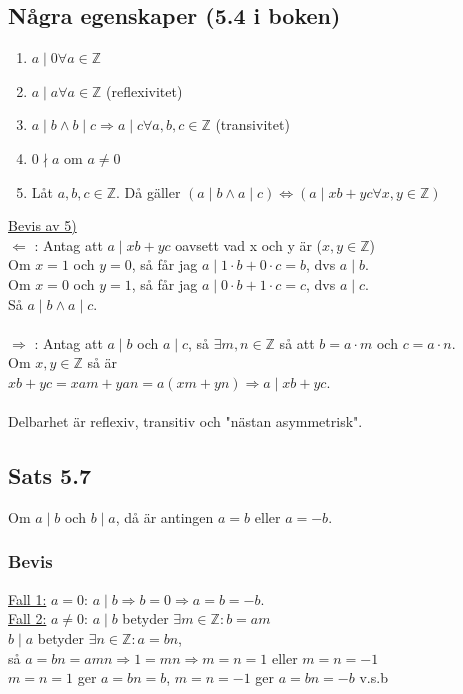 \documentclass{article}
\begin{document}
    \subsection{Några egenskaper (5.4 i boken)}
    \begin{enumerate}
        \item $a\mid 0 \forall a\in \mathbb{Z}$
        \item $a\mid a \forall a\in \mathbb{Z}$ (reflexivitet)
        \item $a\mid b\wedge b\mid c \Rightarrow a\mid c \forall a,b,c\in \mathbb{Z}$ (transivitet)
        \item $0\nmid a$ om $a\neq 0$
        \item Låt $a,b,c\in \mathbb{Z}$. Då gäller $(a\mid b\wedge a\mid c)\Leftrightarrow (a\mid xb+yc \forall x,y\in \mathbb{Z})$
    \end{enumerate}
    \underline{Bevis av 5)}\\
    $\Leftarrow$ : Antag att $a\mid xb+yc$ oavsett vad x och y är ($x,y\in \mathbb{Z}$)\\
    Om $x=1$ och $y=0$, så får jag $a\mid 1\cdot b+0\cdot c=b$, dvs $a\mid b$.\\
    Om $x=0$ och $y=1$, så får jag $a\mid 0\cdot b+1\cdot c=c$, dvs $a\mid c$.\\
    Så $a\mid b\wedge a\mid c$.\\\\
    $\Rightarrow$ : Antag att $a\mid b$ och $a\mid c$, så $\exists m,n\in \mathbb{Z}$ så att $b=a\cdot m$ och $c=a\cdot n$.\\
    Om $x,y\in \mathbb{Z}$ så är\\
    \indent $xb+yc=xam+yan=a(xm+yn)\Rightarrow a\mid xb+yc$.\\
    \\
    Delbarhet är reflexiv, transitiv och "nästan asymmetrisk".

    \subsection{Sats 5.7}
    Om $a\mid b$ och $b\mid a$, då är antingen $a=b$ eller $a=-b$.
    \subsubsection{Bevis}
    \underline{Fall 1:} $a=0$: $a\mid b \Rightarrow b=0 \Rightarrow a=b=-b$.\\
    \underline{Fall 2:} $a\neq 0$: $a\mid b$ betyder $\exists m\in \mathbb{Z} : b=am$\\
    \indent $b\mid a$ betyder $\exists n\in \mathbb{Z} : a=bn$,\\
    så $a=bn=amn\Rightarrow 1=mn\Rightarrow m=n=1$ eller $m=n=-1$\\
    $m=n=1$ ger $a=bn=b$, $m=n=-1$ ger $a=bn=-b$ v.s.b
\end{document}
